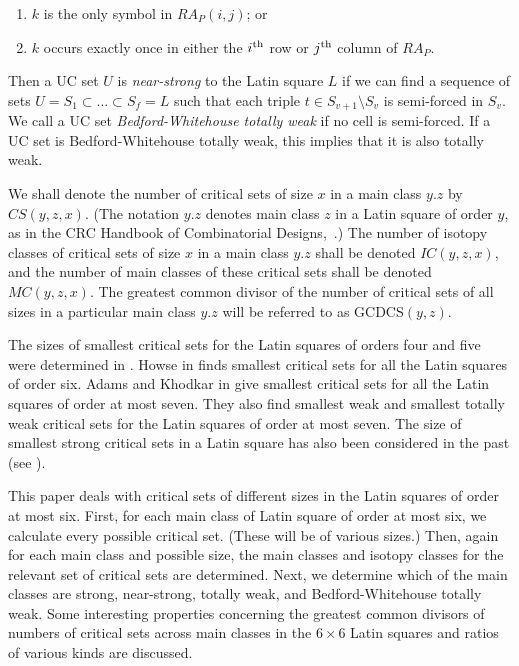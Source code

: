 \begin{enumerate}
\item $k$ is the only symbol in $RA_P(i,j)$; or
\item $k$ occurs exactly once in either the $i^{\rm {th}}$ row or
$j^{\rm {th}}$ column of $RA_P$.
\end{enumerate}

Then a UC set $U$ is {\it near-strong} to the Latin square $L$
if we can find a sequence of sets $U = S_1 \subset \dots \subset S_f = L$
such that each triple $t \in S_{v+1} \setminus S_{v}$ is semi-forced
in $S_v$.  We call a UC set {\it Bedford-Whitehouse totally weak} if no
cell is semi-forced.  If a UC set is Bedford-Whitehouse totally weak,
this implies that it is also totally weak.

We shall denote the number of critical sets of size $x$ in a main class
$y.z$ by $CS(y,z,x)$. (The notation $y.z$ denotes main class $z$ in
a Latin square of order $y$, as in the CRC Handbook of Combinatorial
Designs,~\cite{crc}.)  The number of isotopy classes of critical sets
of size $x$ in a main class $y.z$ shall be denoted $IC(y,z,x)$, and
the number of main classes of these critical sets shall be denoted
$MC(y,z,x)$.  The greatest common divisor of the number of critical
sets of all sizes in a particular main class $y.z$ will be referred to
as GCDCS$(y,z)$.

The sizes of smallest critical sets for the Latin squares of orders 
four and five were determined in \cite {MR95k:05030,MR80j:05022}.
Howse in \cite {MR98m:05026} finds 
smallest critical sets for all the Latin squares of order six.
Adams and Khodkar in \cite {AK2} give smallest critical sets for 
all the Latin squares of order at most seven. They also find \cite {MR2000k:05054}
smallest weak and smallest totally weak critical sets for the Latin squares 
of order at most seven.
The size of smallest strong 
critical sets in a Latin square 
has also been considered in the past (see \cite {MR2000g:05034}). 

This paper deals with critical sets of different sizes in the Latin
squares of order at most six.  First, for each main class of Latin
square of order at most six, we calculate every possible critical set.
(These will be of various sizes.)  Then, again for each main class and
possible size, the main classes and isotopy classes for the relevant set
of critical sets are determined.  Next, we determine which of the main
classes are strong, near-strong, totally weak, and
Bedford-Whitehouse totally weak.  Some interesting properties concerning
the greatest common divisors of numbers of critical sets across main classes in
the $6 \times 6$ Latin squares and ratios of various kinds are discussed.
%

